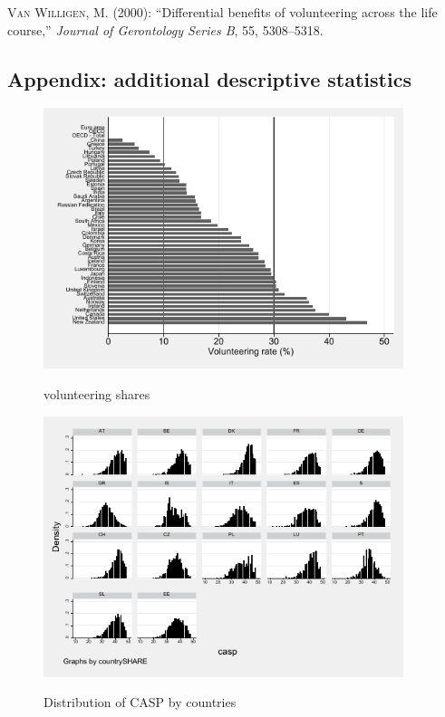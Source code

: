 \documentclass[10pt, letterpaper]{article}
\begin{document}
\begin{spacing}{1.4}
\begin{thebibliography}{87}
\textsc{Van Willigen, M.} (2000): \enquote{Differential benefits of volunteering across the life course,} \emph{Journal of Gerontology Series B}, 55, 5308--5318.


\end{thebibliography}


\begin{spacing}{.9}

\section{Appendix: additional descriptive statistics}

\begin{figure}[H]
 \includegraphics[height=3in]{oecd_age50p.pdf}
 \centering
 \label{fig:oecd_50p}
\caption{volunteering shares}
\end{figure}

\begin{figure}[H]
 \includegraphics[height=3in]{hist_casp.pdf}
 \centering
 \label{fig:hist_casp}
\caption{Distribution of CASP by countries}
\end{figure}


\end{spacing}
\end{spacing}
\end{document}
